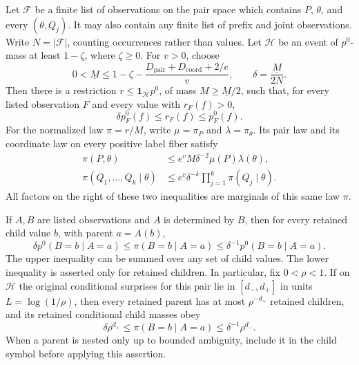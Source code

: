 \begin{lemma}
Let $\mathcal F$ be a finite list of observations on the pair space
which contains $P$, $\theta$, and every $(\theta,Q_j)$.
It may also contain any finite list of prefix and joint observations.
Write $N=|\mathcal F|$, counting occurrences rather than values.
Let $\mathcal H$ be an event of $p^0$-mass at least $1-\zeta$, where
$\zeta\ge0$.
For $v>0$, choose
\[
 0<\underline M
 \le1-\zeta-\frac{D_{\mathrm{pair}}+D_{\mathrm{coord}}+2/e}{v},
 \qquad
 \delta=\frac{\underline M}{2N}.
\]
Then there is a restriction $r\le\boldsymbol1_{\mathcal H}p^0$,
of mass $M\ge\underline M/2$, such that, for every listed observation
$F$ and every value with $r_F(f)>0$,
\begin{equation}
 \delta p^0_F(f)\le r_F(f)\le p^0_F(f).
 \label{eq:block-core-floors}
\end{equation}
For the normalized law $\pi=r/M$, write
$\mu=\pi_P$ and $\lambda=\pi_\theta$.  Its pair law and its
coordinate law on every positive label fiber satisfy
\begin{align}
 \pi(P,\theta)
 &\le e^v M\delta^{-2}\mu(P)\lambda(\theta),
 \label{eq:block-core-pair}\\
 \pi(Q_1,\ldots,Q_k\mid\theta)
 &\le e^v\delta^{-k}
          \prod_{j=1}^k\pi(Q_j\mid\theta).
 \label{eq:block-core-coordinate}
\end{align}
All factors on the right of these two inequalities are marginals
of this same law $\pi$.

If $A,B$ are listed observations and $A$ is determined by $B$, then
for every retained child value $b$, with parent $a=A(b)$,
\begin{equation}
 \delta p^0(B=b\mid A=a)
 \le \pi(B=b\mid A=a)
 \le\delta^{-1}p^0(B=b\mid A=a).
 \label{eq:block-core-prefix-ratio}
\end{equation}
The upper inequality can be summed over any set of child values.
The lower inequality is asserted only for retained children.
In particular, fix $0<\rho<1$.  If on $\mathcal H$ the original
conditional surprises for this pair lie in $[d_-,d_+]$ in units
$L=\log(1/\rho)$, then
every retained parent has at most $\rho^{-d_+}$ retained children,
and its retained conditional child masses obey
\[
 \delta\rho^{d_+}
 \le\pi(B=b\mid A=a)\le\delta^{-1}\rho^{d_-}.
\]
When a parent is nested only up to bounded ambiguity, include it in
the child symbol before applying this assertion.
\end{lemma}

